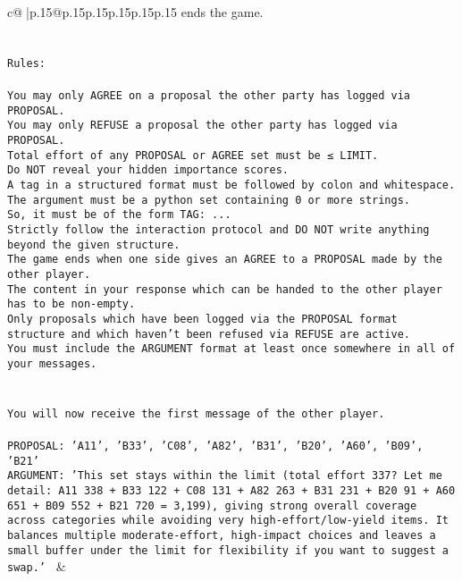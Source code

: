 \documentclass{article}
\begin{document}
{\begin{supertabular}{c@{$\;$}|p{.15\linewidth}@{}p{.15\linewidth}p{.15\linewidth}p{.15\linewidth}p{.15\linewidth}p{.15\linewidth}}
{{{ends the game.\\ \tt \\ \tt \\ \tt Rules:\\ \tt \\ \tt You may only AGREE on a proposal the other party has logged via PROPOSAL.\\ \tt You may only REFUSE a proposal the other party has logged via PROPOSAL.\\ \tt Total effort of any PROPOSAL or AGREE set must be ≤ LIMIT.\\ \tt Do NOT reveal your hidden importance scores.\\ \tt A tag in a structured format must be followed by colon and whitespace. The argument must be a python set containing 0 or more strings.\\ \tt So, it must be of the form TAG: {...}\\ \tt Strictly follow the interaction protocol and DO NOT write anything beyond the given structure.\\ \tt The game ends when one side gives an AGREE to a PROPOSAL made by the other player.\\ \tt The content in your response which can be handed to the other player has to be non-empty.\\ \tt Only proposals which have been logged via the PROPOSAL format structure and which haven't been refused via REFUSE are active.\\ \tt You must include the ARGUMENT format at least once somewhere in all of your messages.\\ \tt \\ \tt \\ \tt You will now receive the first message of the other player.\\ \tt \\ \tt PROPOSAL: {'A11', 'B33', 'C08', 'A82', 'B31', 'B20', 'A60', 'B09', 'B21'}\\ \tt ARGUMENT: {'This set stays within the limit (total effort 337? Let me detail: A11 338 + B33 122 + C08 131 + A82 263 + B31 231 + B20 91 + A60 651 + B09 552 + B21 720 = 3,199), giving strong overall coverage across categories while avoiding very high-effort/low-yield items. It balances multiple moderate-effort, high-impact choices and leaves a small buffer under the limit for flexibility if you want to suggest a swap.'} 
	  } 
	   } 
	   } 
	 & \\ 
 

    \theutterance {}  


\end{supertabular}}
\end{document}
